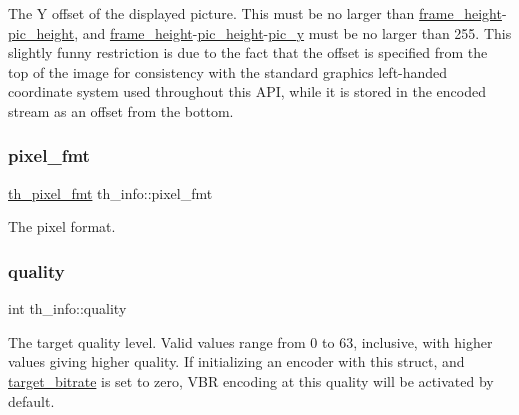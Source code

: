 The Y offset of the displayed picture. This must be no larger than \hyperlink{structth__info_a6b1adc3a16a8336a72692b0a5937214c}{frame\+\_\+height}-\/\hyperlink{structth__info_a775178474283c5990ba73f9ba7f6b88b}{pic\+\_\+height}, and \hyperlink{structth__info_a6b1adc3a16a8336a72692b0a5937214c}{frame\+\_\+height}-\/\hyperlink{structth__info_a775178474283c5990ba73f9ba7f6b88b}{pic\+\_\+height}-\/\hyperlink{structth__info_a8aacc575cab2dfe3735001c2ad32aa14}{pic\+\_\+y} must be no larger than 255. This slightly funny restriction is due to the fact that the offset is specified from the top of the image for consistency with the standard graphics left-\/handed coordinate system used throughout this A\+PI, while it is stored in the encoded stream as an offset from the bottom. \mbox{\label{structth__info_a2301388ef3755c41ab12fd144c1fc54e}} 
\subsubsection{\texorpdfstring{pixel\+\_\+fmt}{pixel\_fmt}}
{\footnotesize\ttfamily \hyperlink{theora_2codec_8h_a5c9e7f2f0c7ed209c9ca3ed0abd328bc}{th\+\_\+pixel\+\_\+fmt} th\+\_\+info\+::pixel\+\_\+fmt}

The pixel format. \mbox{\label{structth__info_aa4cdcf96cb46b256821993e9a830ee02}} 
\subsubsection{\texorpdfstring{quality}{quality}}
{\footnotesize\ttfamily int th\+\_\+info\+::quality}

The target quality level. Valid values range from 0 to 63, inclusive, with higher values giving higher quality. If initializing an encoder with this struct, and \hyperlink{structth__info_a1d9c8d768a4ae623269f5bd8f6f7a015}{target\+\_\+bitrate} is set to zero, V\+BR encoding at this quality will be activated by default. \mbox{\label{structth__info_a1d9c8d768a4ae623269f5bd8f6f7a015}} 
